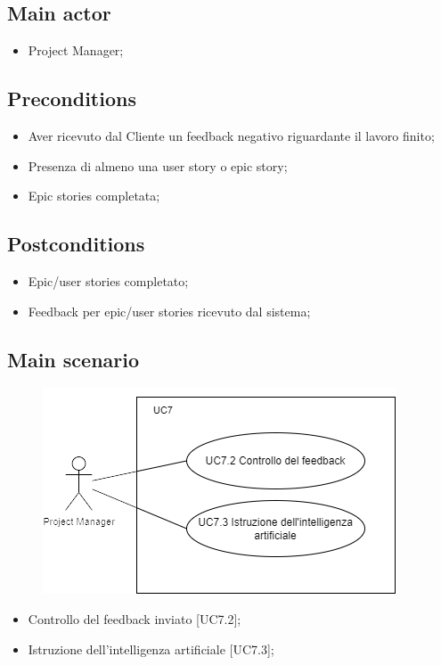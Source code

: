 \documentclass{article}
\begin{document}
    \subsection*{Main actor}
    \begin{itemize}
        \item Project Manager;
    \end{itemize}
    
    \subsection*{Preconditions}
    \begin{itemize}
        \item Aver ricevuto dal Cliente un feedback negativo riguardante il lavoro finito;
        \item Presenza di almeno una user story o epic story;
        \item Epic stories completata;
    \end{itemize}
    
    \subsection*{Postconditions}
    \begin{itemize}
        \item Epic/user stories completato;
        \item Feedback per epic/user stories ricevuto dal sistema; 
    \end{itemize}
    
    \subsection*{Main scenario}
        \begin{figure}[h]
            \centering
            \includegraphics{./imgUML/UC7-zoom.png}
            \label{fig:immagine}
        \end{figure}
        \begin{itemize}
            \item Controllo del feedback inviato [UC7.2];
            \item Istruzione dell'intelligenza artificiale [UC7.3];
        \end{itemize}
        
\end{document}
